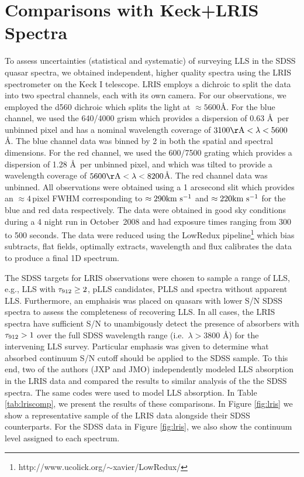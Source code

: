 \documentclass[12pt,preprint]{aastex}
\begin{document}
\section{Comparisons with Keck+LRIS Spectra}
\label{appx:keck}

To assess uncertainties (statistical and systematic)
of surveying LLS in the SDSS quasar spectra, we
obtained independent, higher quality spectra using the LRIS spectrometer
\citep{lris} on the Keck I telescope.  
LRIS employs a dichroic to split the data into two
spectral channels, each with its own camera.
For our observations, we employed the d560 dichroic which splits the 
light at $\approx 5600$\AA.
For the blue channel, we used the 640/4000 grism
which provides a dispersion of 0.63 \AA\ per unbinned pixel and has a nominal
wavelength coverage of $3100 \rAA < \lambda < 5600$ \AA.  The blue channel
data was binned by 2 in both the spatial and spectral dimensions. For the red
channel, we used the 600/7500 grating which provides a dispersion of
1.28 \AA\ per unbinned pixel, and which was tilted to provide a wavelength
coverage of $5600 \rAA < \lambda < 8200$\AA.  The red channel data was unbinned.
All observations were obtained using a 1 arcsecond slit which provides
an $\approx 4$\,pixel FWHM corresponding to 
$\approx 290{\rm km~s^{-1}}$ and $\approx 220 {\rm km~s^{-1}}$ for the blue and red
data respectively.
The data were obtained in good sky conditions during a 4 night
run in October~2008 and had
exposure times ranging from 300 to 500 seconds.
The data were reduced using the LowRedux
pipeline\footnote{http://www.ucolick.org/$\sim$xavier/LowRedux/} which
bias subtracts, flat fields, optimally extracts, wavelength and flux
calibrates the data to produce a final 1D spectrum.  

The SDSS targets for LRIS observations were chosen to sample a range
of LLS, e.g., LLS with $\tau_{\rm 912} \ge 2$, pLLS
candidates, PLLS and spectra without apparent LLS.  Furthermore, 
an emphaisis was placed on quasars with lower S/N SDSS spectra 
to assess the completeness of recovering LLS. 
In all cases, the LRIS spectra have sufficient S/N 
to unambigously detect the presence of absorbers with $\tau_{\rm 912} > 1$ 
over the full SDSS wavelength range (i.e.\ $\lambda > 3800$ \AA) for
the intervening LLS survey. 
Particular emphasis was given 
to determine what absorbed continuum S/N cutoff should be applied to
the SDSS sample.  To this end, two of the authors (JXP and JMO)
independently modeled LLS absorption in the LRIS data and 
compared the results to similar analysis of the 
the SDSS spectra.  The same
codes were used to model LLS absorption.  In Table
\ref{tab:lriscomp}, we present the results of these comparisons.  In
Figure \ref{fig:lris} we show a representative sample of the
LRIS data alongside their SDSS counterparts.  For the SDSS data in
Figure \ref{fig:lris}, we also show the continuum level assigned
to each spectrum.  
\end{document}
